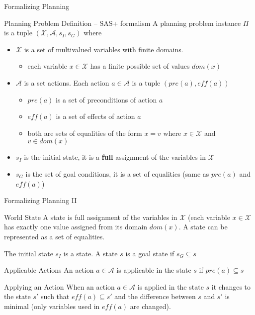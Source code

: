 \documentclass[t]{sdqbeamer}
\begin{document}
\begin{frame}{Formalizing Planning}
\begin{block}{Planning Problem Definition -- SAS+ formalism}
A planning problem instance $\Pi$ is a tuple $(\mathcal{X}, \mathcal{A}, s_I, s_G)$ where
\begin{itemize}
	\item $\mathcal{X}$ is a set of multivalued variables with finite domains.
	\begin{itemize}
	\item each variable $x\in \mathcal{X}$ has a finite possible set of values $dom(x)$
	\end{itemize}
	\item $\mathcal{A}$ is a set actions. Each action $a\in\mathcal{A}$ is a tuple $(pre(a),eff(a))$
	\begin{itemize}
	\item $pre(a)$ is a set of preconditions of action $a$
	\item $eff(a)$ is a set of effects of action $a$
	\item both are sets of equalities of the form $x=v$ where $x\in\mathcal{X}$ and $v\in dom(x)$	
	\end{itemize}
	\item $s_I$ is the initial state, it is a \textbf{full} assignment of the variables in $\mathcal{X}$
	\item $s_G$ is the set of goal conditions, it is a set of equalities (same as $pre(a)$ and $eff(a)$)
\end{itemize}
\end{block}
\end{frame}

\begin{frame}{Formalizing Planning II}
\begin{block}{World State}
A state is full assignment of the variables in $\mathcal{X}$ (each variable $x \in \mathcal{X}$
has exactly one value assigned from its domain $dom(x)$. A state can be represented as a set of equalities.
\end{block}
The initial state $s_I$ is a state. A state $s$ is a goal state if $s_G \subseteq s$
\begin{block}{Applicable Actions}
An action $a\in\mathcal{A}$ is applicable in the state $s$ if $pre(a) \subseteq s$
\end{block}
\begin{block}{Applying an Action}
When an action $a\in\mathcal{A}$ is applied in the state $s$ it changes to the state $s'$
such that $eff(a)\subseteq s'$ and the difference between $s$ and $s'$ is minimal
(only variables used in $eff(a)$ are changed).
\end{block}
\end{frame}
\end{document}

